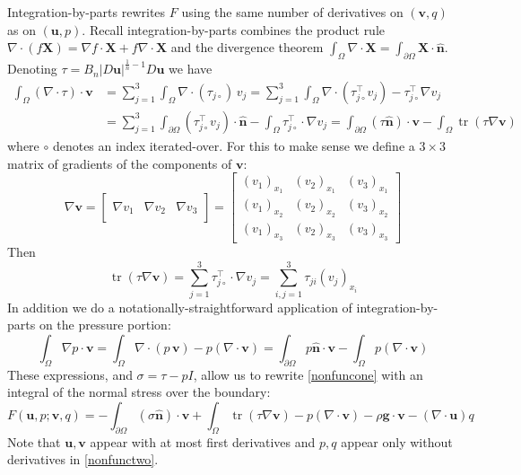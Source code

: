 \documentclass[letterpaper,final,12pt,reqno]{amsart}
\newcommand{\grad}{\nabla}
\newcommand{\trace}{\operatorname{tr}}
\newcommand{\hbn}{\hat{\mathbf{n}}}
\newcommand{\bu}{\mathbf{u}}
\newcommand{\bv}{\mathbf{v}}
\newcommand{\bX}{\mathbf{X}}
\begin{document}
Integration-by-parts rewrites $F$ using the same number of derivatives on $(\bv,q)$ as on $(\bu,p)$.  Recall integration-by-parts combines the product rule $\nabla \cdot(f\bX) = \grad f\cdot \bX + f \nabla \cdot \bX$ and the divergence theorem $\int_\Omega \nabla \cdot \bX = \int_{\partial \Omega} \bX \cdot \hbn$.  Denoting $\tau = B_n |D\bu|^{\frac{1}{n} - 1} D\bu$ we have
\begin{align*}
\int_\Omega \left(\nabla \cdot \tau\right)\cdot \bv &= \sum_{j=1}^3 \int_\Omega \nabla \cdot (\tau_{j\circ})\, v_j = \sum_{j=1}^3 \int_\Omega \nabla \cdot (\tau_{j\circ}^\top v_j) - \tau_{j\circ}^\top \nabla v_j \\
  &= \sum_{j=1}^3 \int_{\partial \Omega} (\tau_{j\circ}^\top v_j) \cdot \hbn - \int_\Omega \tau_{j\circ}^\top \cdot \nabla v_j = \int_{\partial \Omega} (\tau \hbn)\cdot \bv - \int_\Omega \trace(\tau \nabla \bv)
\end{align*}
where $\circ$ denotes an index iterated-over.  For this to make sense we define a $3\times 3$ matrix of gradients of the components of $\bv$:
\newcommand{\trefthree}[3]{\left[\begin{array}{c|c|c} & & \\ #1 & #2 & #3 \\ & & \end{array}\right]}
    $$\grad \bv = \trefthree{\grad v_1}{\grad v_2}{\grad v_3} = \begin{bmatrix}
    (v_1)_{x_1} & (v_2)_{x_1} & (v_3)_{x_1} \\
    (v_1)_{x_2} & (v_2)_{x_2} & (v_3)_{x_2} \\
    (v_1)_{x_3} & (v_2)_{x_3} & (v_3)_{x_3}
    \end{bmatrix}$$
Then
    $$\trace(\tau \grad \bv) = \sum_{j=1}^3 \tau_{j\circ}^\top \cdot \grad v_j = \sum_{i,j=1}^3 \tau_{ji} (v_j)_{x_i}$$
In addition we do a notationally-straightforward application of integration-by-parts on the pressure portion:
    $$\int_\Omega \nabla p \cdot \bv = \int_\Omega \nabla\cdot (p\,\bv) - p (\nabla \cdot \bv) = \int_{\partial \Omega} p\hbn \cdot \bv - \int_\Omega p (\nabla \cdot \bv)$$
These expressions, and $\sigma=\tau-pI$, allow us to rewrite \eqref{nonfuncone} with an integral of the normal stress over the boundary:
\begin{equation}
F(\bu,p;\bv,q) = -\int_{\partial\Omega} (\sigma \hbn)\cdot \bv + \int_\Omega \trace(\tau \nabla \bv) - p (\nabla \cdot \bv) - \rho \mathbf{g} \cdot \bv - \left(\nabla \cdot \bu\right) q \label{nonfunctwo}
\end{equation}
Note that $\bu,\bv$ appear with at most first derivatives and $p,q$ appear only without derivatives in \eqref{nonfunctwo}.
\end{document}
